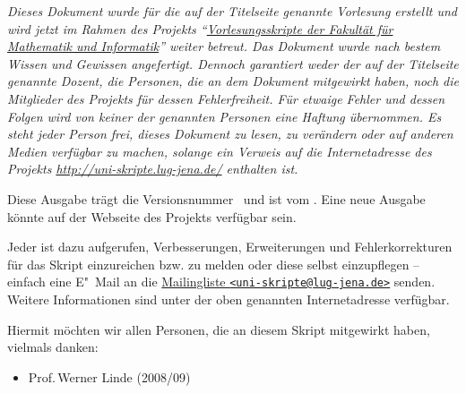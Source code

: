\documentclass[ngerman,draft,parskip=half,twoside]{scrartcl}
\begin{document}
\appendix
\clearpage
{}

{\itshape
  Dieses Dokument wurde für die auf der Titelseite genannte Vorlesung erstellt
  und wird jetzt im Rahmen des Projekts
  \enquote{\href{http://uni-skripte.lug-jena.de/}{Vorlesungsskripte der
  Fakultät für Mathematik und Informatik}} weiter betreut. Das Dokument wurde
  nach bestem Wissen und Gewissen angefertigt. Dennoch garantiert weder der auf
  der Titelseite genannte Dozent, die Personen, die an dem Dokument mitgewirkt
  haben, noch die Mitglieder des Projekts für dessen Fehlerfreiheit. Für
  etwaige Fehler und dessen Folgen wird von keiner der genannten Personen eine
  Haftung übernommen. Es steht jeder Person frei, dieses Dokument zu lesen, zu
  verändern oder auf anderen Medien verfügbar zu machen, solange ein Verweis
  auf die Internetadresse des Projekts \url{http://uni-skripte.lug-jena.de/}
  enthalten ist.

  Diese Ausgabe trägt die Versionsnummer~\SVNLastChangedRevision{} und ist vom
  \SVNDate{}. Eine neue Ausgabe könnte auf der Webseite des Projekts verfügbar
  sein.

  Jeder ist dazu aufgerufen, Verbesserungen, Erweiterungen und
  Fehlerkorrekturen für das Skript einzureichen bzw. zu melden oder diese
  selbst einzupflegen -- einfach eine E"~Mail an die
  \href{mailto:uni-skripte@lug-jena.de}{Mailingliste
  \nolinkurl{<uni-skripte@lug-jena.de>}} senden. Weitere Informationen sind
  unter der oben genannten Internetadresse verfügbar.

  Hiermit möchten wir allen Personen, die an diesem Skript mitgewirkt haben,
  vielmals danken:
  \begin{itemize}
   \item Prof.\,Werner Linde (2008/09)
  \end{itemize}
}

\clearpage
{}
\printindex
\end{document}
